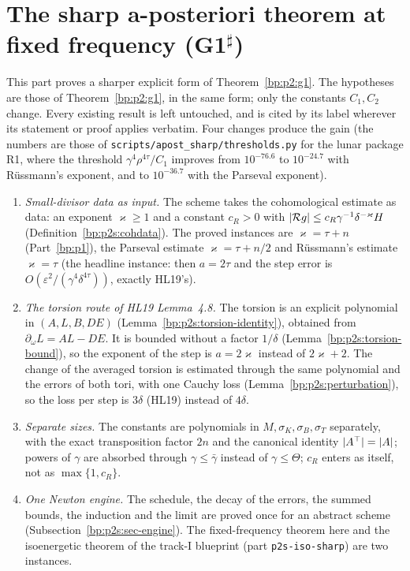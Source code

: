 \section{The sharp a-posteriori theorem at fixed frequency (G1$^\sharp$)}\label{bp:p2s}

This part proves a sharper explicit form of Theorem~\ref{bp:p2:g1}. The hypotheses are those of
Theorem~\ref{bp:p2:g1}, in the same form; only the constants $C_1,C_2$ change. Every existing result is
left untouched, and is cited by its label wherever its statement or proof applies verbatim. Four changes
produce the gain (the numbers are those of \texttt{scripts/apost\_sharp/thresholds.py} for the lunar
package R1, where the threshold $\gamma^4\rho^{4\tau}/C_1$ improves from $10^{-76.6}$ to $10^{-24.7}$ with R\"ussmann's
exponent, and to $10^{-36.7}$ with the Parseval exponent).
\begin{enumerate}[label=(\arabic*)]
\item \emph{Small-divisor data as input.} The scheme takes the cohomological estimate as data: an
  exponent $\varkappa\ge1$ and a constant $c_R>0$ with $\lvert \mathcal Rg\rvert\le c_R\gamma^{-1}\delta^{-\varkappa}H$
  (Definition~\ref{bp:p2s:cohdata}). The proved instances are $\varkappa=\tau+n$ (Part~\ref{bp:p1}), the Parseval
  estimate $\varkappa=\tau+n/2$ and R\"ussmann's estimate $\varkappa=\tau$ (the headline instance: then $a=2\tau$ and the
  step error is $O(\varepsilon^2/(\gamma^4\delta^{4\tau}))$, exactly HL19's).
\item \emph{The torsion route of HL19 Lemma~4.8.} The torsion is an explicit polynomial in $(A,L,B,DE)$
  (Lemma~\ref{bp:p2s:torsion-identity}), obtained from $\partial_\omega L=AL-DE$. It is bounded without a factor
  $1/\delta$ (Lemma~\ref{bp:p2s:torsion-bound}), so the exponent of the step is $a=2\varkappa$ instead of
  $2\varkappa+2$. The change of the averaged torsion is estimated through the same polynomial and the errors of
  both tori, with one Cauchy loss (Lemma~\ref{bp:p2s:perturbation}), so the loss per step is $3\delta$ (HL19)
  instead of $4\delta$.
\item \emph{Separate sizes.} The constants are polynomials in $M,\sigma_K,\sigma_B,\sigma_T$ separately,
  with the exact transposition factor $2n$ and the canonical identity $\lvert A^\top\rvert=\lvert A\rvert$; powers of $\gamma$
  are absorbed through $\gamma\le\bar\gamma$ instead of $\gamma\le\Theta$; $c_R$ enters as itself, not as
  $\max\{1,c_R\}$.
\item \emph{One Newton engine.} The schedule, the decay of the errors, the summed bounds, the induction and the
  limit are proved once for an abstract scheme (Subsection~\ref{bp:p2s:sec-engine}). The fixed-frequency
  theorem here and the isoenergetic theorem of the track-I blueprint (part \texttt{p2s-iso-sharp}) are two
  instances.
\end{enumerate}
